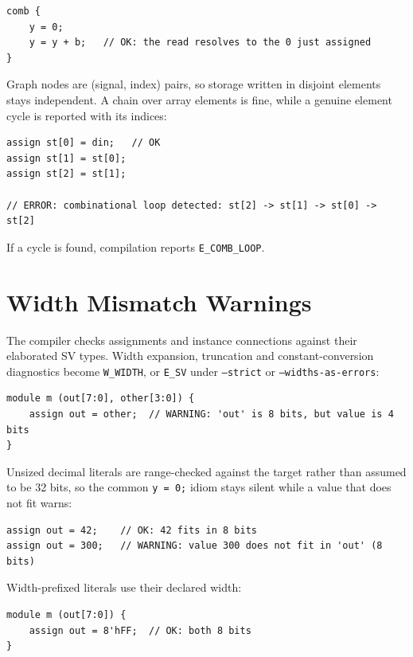 \documentclass[lang=en,11pt]{elegantbook}
\newcommand{\code}[1]{\texttt{#1}}
\begin{document}
\begin{lstlisting}[language=Slip]
comb {
    y = 0;
    y = y + b;   // OK: the read resolves to the 0 just assigned
}
\end{lstlisting}

Graph nodes are (signal, index) pairs, so storage written in disjoint elements stays independent. A chain over array elements is fine, while a genuine element cycle is reported with its indices:

\begin{lstlisting}[language=Slip]
assign st[0] = din;   // OK
assign st[1] = st[0];
assign st[2] = st[1];

// ERROR: combinational loop detected: st[2] -> st[1] -> st[0] -> st[2]
\end{lstlisting}

If a cycle is found, compilation reports \code{E\_COMB\_LOOP}.

\section{Width Mismatch Warnings}

The compiler checks assignments and instance connections against their elaborated
SV types. Width expansion, truncation and constant-conversion diagnostics become
\code{W\_WIDTH}, or \code{E\_SV} under \code{--strict} or
\code{--widths-as-errors}:

\begin{lstlisting}[language=Slip]
module m (out[7:0], other[3:0]) {
    assign out = other;  // WARNING: 'out' is 8 bits, but value is 4 bits
}
\end{lstlisting}

Unsized decimal literals are range-checked against the target rather than assumed to be 32 bits, so the common \code{y = 0;} idiom stays silent while a value that does not fit warns:

\begin{lstlisting}[language=Slip]
assign out = 42;    // OK: 42 fits in 8 bits
assign out = 300;   // WARNING: value 300 does not fit in 'out' (8 bits)
\end{lstlisting}

Width-prefixed literals use their declared width:

\begin{lstlisting}[language=Slip]
module m (out[7:0]) {
    assign out = 8'hFF;  // OK: both 8 bits
}
\end{lstlisting}
\end{document}

